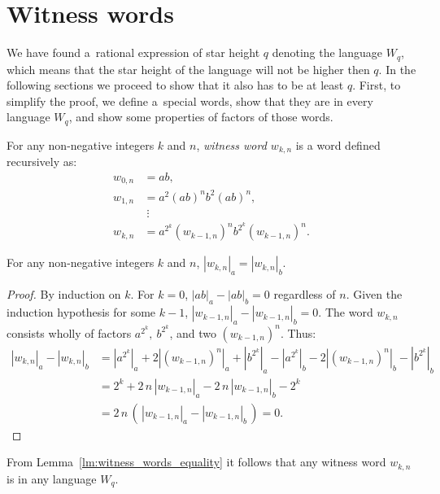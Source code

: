 \newpage\openright

\section{Witness words}\label{section:witness_words}

We have found a~rational expression of star height $q$ denoting the language $W_q$, which means that the star height of the language will not be higher then $q$. In the following sections we proceed to show that it also has to be at least $q$. First, to simplify the proof, we define a~special words, show that they are in every language $W_q$, and show some properties of factors of those words.

\begin{defn}
    For any non-negative integers $k$ and $n$, \emph{witness word $w_{k,n}$} is a word defined recursively as:
    \begin{align*}
        w_{0,n} &= ab,\\
        w_{1,n} &= a^2 {(ab)}^n b^2 {(ab)}^n,\\
                &\; \vdots \\
        w_{k,n} &= a^{2^k} {(w_{k-1,n})}^n b^{2^k} {(w_{k-1,n})}^n.
    \end{align*}
\end{defn}

\begin{lemma}\label{lm:witness_words_equality}
    For any non-negative integers $k$ and $n$, $|w_{k,n}|_a = |w_{k,n}|_b$.
\end{lemma}

\begin{proof}
    By induction on $k$. For $k = 0$, $|ab|_a - |ab|_b = 0$ regardless of $n$. Given the induction hypothesis for some $k - 1$, $|w_{k-1,n}|_a - |w_{k-1,n}|_b = 0$. The word $w_{k,n}$ consists wholly of factors $a^{2^k}, \: b^{2^k}$, and two ${(w_{k-1,n})}^n$. Thus:
    \begin{align*}
        |w_{k,n}|_a - |w_{k,n}|_b &= |a^{2^k}|_a + 2|{(w_{k-1,n})}^n|_a + |b^{2^k}|_a - |a^{2^k}|_b - 2|{(w_{k-1,n})}^n|_b - |b^{2^k}|_b \\
        &= 2^k + 2 \, n \, |w_{k-1,n}|_a - 2 \, n \, |w_{k-1,n}|_b - 2^k \\
        &= 2 \, n \, ( \, |w_{k-1,n}|_a - |w_{k-1,n}|_b \, ) = 0.
    \end{align*}
\end{proof}

From Lemma~\ref*{lm:witness_words_equality} it follows that any witness word $w_{k,n}$ is in any language $W_q$.

